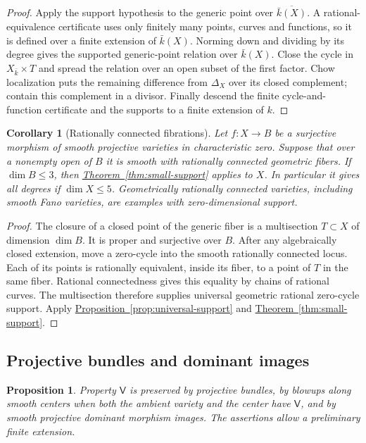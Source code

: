 \documentclass[11pt,a4paper]{article}
\newtheorem{proposition}[theorem]{Proposition}
\newtheorem{corollary}[theorem]{Corollary}
\theoremstyle{definition}
\theoremstyle{remark}\newtheorem{remark}[theorem]{Remark}
\numberwithin{equation}{section}
\newcommand{\thmref}[1]{\hyperref[#1]{\textcolor{resultlink}{Theorem~\ref*{#1}}}}
\newcommand{\propref}[1]{\hyperref[#1]{\textcolor{resultlink}{Proposition~\ref*{#1}}}}
\begin{document}
\begin{proof}
Apply the support hypothesis to the generic point over
$\overline{\bar k(X)}$. A rational-equivalence certificate uses only
finitely many points, curves and functions, so it is defined over a
finite extension of $\bar k(X)$. Norming down and dividing by its
degree gives the supported generic-point relation over $\bar k(X)$.
Close the cycle in $X_{\bar k}\times T$ and spread the relation over
an open subset of the first factor. Chow localization puts the
remaining difference from $\Delta_X$ over its closed complement;
contain this complement in a divisor. Finally descend the finite
cycle-and-function certificate and the supports to a finite
extension of $k$.
\end{proof}

\begin{corollary}[Rationally connected fibrations]\label{cor:rc-fibrations}
Let $f:X\to B$ be a surjective morphism of smooth projective varieties
in characteristic zero. Suppose that over a nonempty open of $B$ it
is smooth with rationally connected geometric fibers. If $\dim B\leq3$,
then \thmref{thm:small-support} applies to $X$. In particular it gives
all degrees if $\dim X\leq5$. Geometrically rationally connected
varieties, including smooth Fano varieties, are examples with
zero-dimensional support.
\end{corollary}

\begin{proof}
The closure of a closed point of the generic fiber is a multisection
$T\subset X$ of dimension $\dim B$. It is proper and surjective over
$B$. After any algebraically closed extension, move a zero-cycle
into the smooth rationally connected locus. Each of its points is
rationally equivalent, inside its fiber, to a point of $T$ in the
same fiber. Rational connectedness gives this equality by chains of
rational curves. The multisection therefore supplies universal
geometric rational zero-cycle support. Apply
\propref{prop:universal-support} and \thmref{thm:small-support}.
\end{proof}

\subsection{Projective bundles and dominant images}

\begin{proposition}\label{prop:closures}
Property $\mathsf V$ is preserved by projective bundles, by blowups
along smooth centers when both the ambient variety and the center
have $\mathsf V$, and by smooth projective dominant morphism images.
The assertions allow a preliminary finite extension.
\end{proposition}
\end{document}
